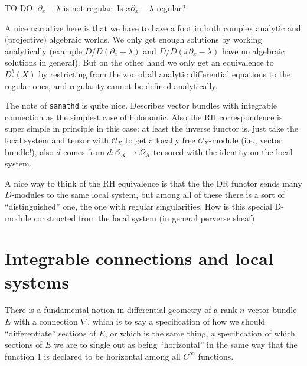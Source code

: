 \documentclass[12pt]{article}
\theoremstyle{plain}
\theoremstyle{definition}
\numberwithin{equation}{section}
\newcommand{\OO}{\mathcal{O}}
\begin{document}
TO DO: $\partial_x - \lambda$ is not regular. Is $x \partial_x - \lambda$ regular?

A nice narrative here is that we have to have a foot in both complex analytic and (projective) algebraic worlds. We only get enough solutions by working analytically (example $D / D(\partial_x - \lambda)$ and $D / D(x\partial_x - \lambda)$ have no algebraic solutions in general). But on the other hand we only get an equivalence to $D_c^b(X)$ by restricting from the zoo of all analytic differential equations to the regular ones, and regularity cannot be defined analytically.


{\color{blue}The note of \texttt{sanathd} is quite nice. Describes vector bundles with integrable connection as the simplest case of holonomic. Also the RH correspondence is super simple in principle in this case: at least the inverse functor is, just take the local system and tensor with $\OO_X$ to get a locally free $\OO_X$-module (i.e., vector bundle!), also $d$ comes from $d : \OO_X \rightarrow \Omega_X$ tensored with the identity on the local system.

A nice way to think of the RH equivalence is that the the DR functor sends many $D$-modules to the same local system, but among all of these there is a sort of ``distinguished'' one, the one with regular singularities. How is this special D-module constructed from the local system (in general perverse sheaf)
}

\section{Integrable connections and local systems}


There is a fundamental notion in differential geometry of a rank $n$ vector bundle $E$ with a connection $\nabla$, which is to say a specification of how we should ``differentiate'' sections of $E$, or which is the same thing, a specification of which sections of $E$ we are to single out as being ``horizontal'' in the same way that the function $1$ is declared to be horizontal among all $C^\infty$ functions.

\newcommand{\E}{\mathcal{E}}
\end{document}
